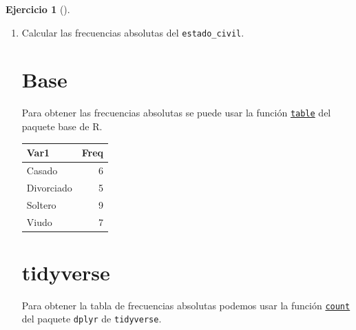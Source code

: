 \documentclass[
  spanish,
  a4paper,
]{scrreport}
\newenvironment{Shaded}{\begin{snugshade}}{\end{snugshade}}
\newcommand{\FunctionTok}[1]{\textcolor[rgb]{0.28,0.35,0.67}{#1}}
\newcommand{\NormalTok}[1]{\textcolor[rgb]{0.00,0.23,0.31}{#1}}
\newcommand{\SpecialCharTok}[1]{\textcolor[rgb]{0.37,0.37,0.37}{#1}}
\theoremstyle{definition}
\newtheorem{exercise}{Ejercicio}[chapter]
\theoremstyle{remark}
\begin{document}
\begin{exercise}[]
\begin{enumerate}
\begin{tcolorbox}
  \end{tcolorbox}
\item
  Calcular las frecuencias absolutas del \texttt{estado\_civil}.

  \begin{tcolorbox}[enhanced jigsaw, titlerule=0mm, arc=.35mm, rightrule=.15mm, opacitybacktitle=0.6, leftrule=.75mm, colframe=quarto-callout-tip-color-frame, toptitle=1mm, breakable, colbacktitle=quarto-callout-tip-color!10!white, bottomrule=.15mm, colback=white, left=2mm, bottomtitle=1mm, opacityback=0, title=\textcolor{quarto-callout-tip-color}{\faLightbulb}\hspace{0.5em}{Solución}, toprule=.15mm, coltitle=black]

  \section{Base}

  Para obtener las frecuencias absolutas se puede usar la función
  \href{https://www.rdocumentation.org/packages/base/versions/3.6.2/topics/table}{\texttt{table}}
  del paquete base de R.

\begin{Shaded}
\end{Shaded}

  \begin{longtable}[]{@{}lr@{}}
  \toprule\noalign{}
  Var1 & Freq \\
  \midrule\noalign{}
  \endhead
  \bottomrule\noalign{}
  \endlastfoot
  Casado & 6 \\
  Divorciado & 5 \\
  Soltero & 9 \\
  Viudo & 7 \\
  \end{longtable}

  \section{tidyverse}

  Para obtener la tabla de frecuencias absolutas podemos usar la función
  \href{https://aprendeconalf.es/manual-r/06-preprocesamiento.html\#conteo-del-n\%C3\%BAmero-de-observaciones}{\texttt{count}}
  del paquete \texttt{dplyr} de \texttt{tidyverse}.


\end{tcolorbox}
\end{enumerate}
\end{exercise}
\end{document}
